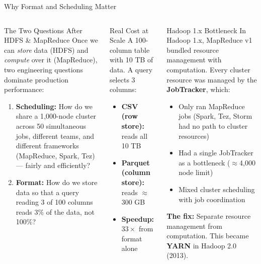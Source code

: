 \documentclass[aspectratio=169,10pt]{beamer}
\begin{document}
\begin{frame}{Why Format and Scheduling Matter}
  \begin{columns}[T]
      \begin{block}{The Two Questions After HDFS \& MapReduce}
        Once we can \emph{store} data (HDFS) and \emph{compute} over it (MapReduce), two engineering questions dominate production performance:
        \vspace{4pt}
        \begin{enumerate}
          \item \textbf{Scheduling:} How do we share a 1{,}000-node cluster across 50 simultaneous jobs, different teams, and different frameworks (MapReduce, Spark, Tez) — fairly and efficiently?
          \item \textbf{Format:} How do we store data so that a query reading 3 of 100 columns reads 3\% of the data, not 100\%?
        \end{enumerate}
      \end{block}
      \vspace{4pt}
      \begin{exampleblock}{Real Cost at Scale}
        \small A 100-column table with 10 TB of data. A query selects 3 columns:
        \begin{itemize}
          \item \textbf{CSV (row store):} reads all 10 TB
          \item \textbf{Parquet (column store):} reads $\approx$300 GB
          \item \textbf{Speedup: $33\times$} from format alone
        \end{itemize}
      \end{exampleblock}

      \begin{alertblock}{Hadoop 1.x Bottleneck}
        In Hadoop 1.x, MapReduce v1 bundled resource management with computation. Every cluster resource was managed by the \textbf{JobTracker}, which:
        \vspace{4pt}
        \begin{itemize}
          \item Only ran MapReduce jobs (Spark, Tez, Storm had no path to cluster resources)
          \item Had a single JobTracker as a bottleneck ($\approx$4{,}000 node limit)
          \item Mixed cluster scheduling with job coordination
        \end{itemize}
        \vspace{4pt}
        \textbf{The fix:} Separate resource management from computation. This became \textbf{YARN} in Hadoop 2.0 (2013).
      \end{alertblock}
  \end{columns}
\end{frame}
\end{document}

